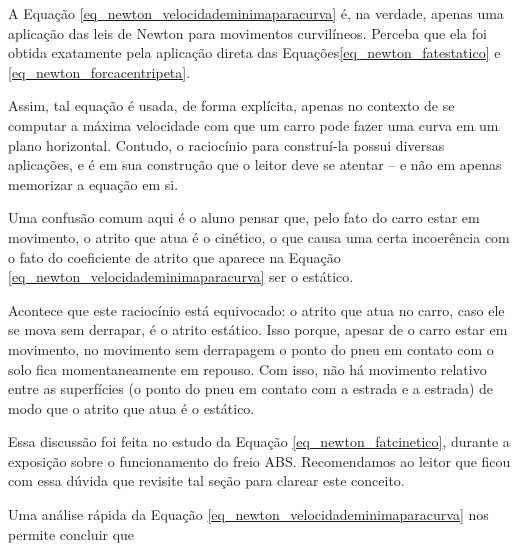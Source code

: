 

A Equação \eqref{eq_newton_velocidademinimaparacurva} é, na verdade, apenas uma aplicação das leis de Newton para movimentos curvilíneos. Perceba que ela foi obtida exatamente pela aplicação direta das Equações\eqref{eq_newton_fatestatico} e \eqref{eq_newton_forcacentripeta}.

Assim, tal equação é usada, de forma explícita, apenas no contexto de se computar a máxima velocidade com que um carro pode fazer uma curva em um plano horizontal. Contudo, o raciocínio para construí-la possui diversas aplicações, e é em sua construção que o leitor deve se atentar -- e não em apenas memorizar a equação em si.




Uma confusão comum aqui é o aluno pensar que, pelo fato do carro estar em movimento, o atrito que atua é o cinético, o que causa uma certa incoerência com o fato do coeficiente de atrito que aparece na Equação \eqref{eq_newton_velocidademinimaparacurva} ser o estático.

Acontece que este raciocínio está equivocado: o atrito que atua no carro, caso ele se mova sem derrapar, é o atrito estático. Isso porque, apesar de o carro estar em movimento, no movimento sem derrapagem o ponto do pneu em contato com o solo fica momentaneamente em repouso. Com isso, não há movimento relativo entre as superfícies (o ponto do pneu em contato com a estrada e a estrada) de modo que o atrito que atua é o estático.

Essa discussão foi feita no estudo da Equação \eqref{eq_newton_fatcinetico}, durante a exposição sobre o funcionamento do freio ABS. Recomendamos ao leitor que ficou com essa dúvida que revisite tal seção para clarear este conceito.





Uma análise rápida da Equação \eqref{eq_newton_velocidademinimaparacurva} nos permite concluir que

